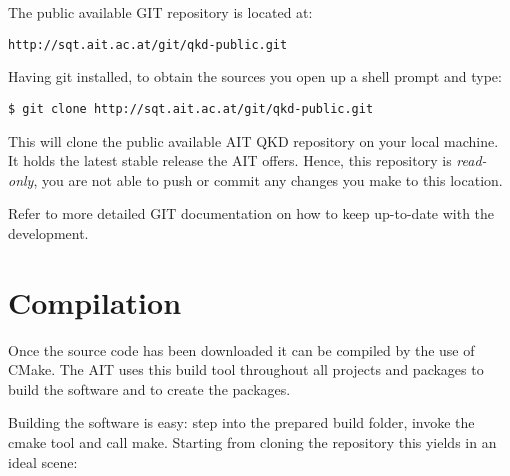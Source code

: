 \medskip

The public available GIT repository is located at:

\begin{center}
\texttt{http://sqt.ait.ac.at/git/qkd-public.git}
\end{center}

Having git installed, to obtain the sources you open up a shell prompt and type:

\begin{minipage}{0.9\textwidth}
\bigskip
\begin{verbatim}
$ git clone http://sqt.ait.ac.at/git/qkd-public.git
\end{verbatim}
\medskip
\end{minipage}

\medskip

This will clone the public available AIT QKD repository on your local machine. It holds the latest stable release the AIT offers. Hence, this repository is \textit{read-only}, you are not able to push or commit any changes you make to this location. 

\medskip

Refer to more detailed GIT documentation on how to keep up-to-date with the development.


\section{Compilation}
\label{sec:Compilation}

Once the source code has been downloaded it can be compiled by the use of CMake. The AIT uses this build tool throughout all projects and packages to build the software and to create the packages.

\medskip

Building the software is easy: step into the prepared build folder, invoke the cmake tool and call make. Starting from cloning the repository this yields in an ideal scene:

